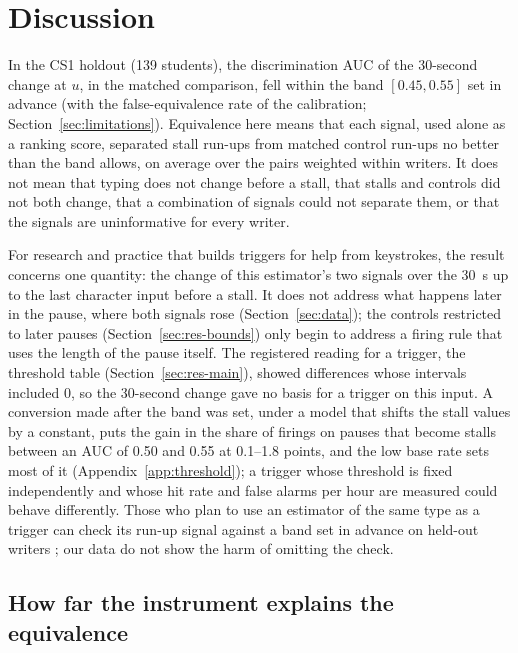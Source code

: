 \section{Discussion}
\label{sec:discussion}

In the CS1 holdout (139 students), the discrimination AUC of the 30-second change at $u$, in the matched comparison, fell
within the band $[0.45, 0.55]$ set in advance (with the false-equivalence rate of the calibration; Section~\ref{sec:limitations}). Equivalence here
means that each signal, used alone as a ranking score, separated stall run-ups from matched control run-ups no better
than the band allows, on average over the pairs weighted within writers. It does not mean that typing does not change
before a stall, that stalls and controls did not both change, that a combination of signals could not separate them, or
that the signals are uninformative for every writer.

For research and practice that builds triggers for help from keystrokes, the result concerns one quantity: the change of
this estimator's two signals over the 30~s up to the last character input before a stall. It does not address what
happens later in the pause, where both signals rose (Section~\ref{sec:data}); the controls restricted to later pauses
(Section~\ref{sec:res-bounds}) only begin to address a firing rule that uses the length of the pause itself. The registered reading for a trigger, the threshold table (Section~\ref{sec:res-main}), showed differences whose
intervals included 0, so the 30-second change gave no basis for a trigger on this input. A conversion made after the band was set, under a model that
shifts the stall values by a constant, puts the gain in the share of firings on pauses that become stalls between an AUC
of 0.50 and 0.55 at 0.1--1.8 points, and the low base rate sets most of it (Appendix~\ref{app:threshold}); a trigger whose
threshold is fixed independently and whose hit rate and false alarms per hour are measured could behave differently. Those who plan to use an estimator of the same type as a trigger can
check its run-up signal against a band set in advance \cite{lakens2017equivalence} on held-out writers
\cite{gardner2018evaluating}; our data do not show the harm of omitting the check.

\subsection{How far the instrument explains the equivalence}

